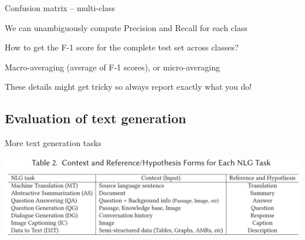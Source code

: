 \documentclass[12pt,aspectratio=169,handout]{beamer}
\begin{document}
\begin{frame}{Confusion matrix -- multi-class}

We can unambiguously compute Precision and Recall for each class

How to get the F-1 score for the complete test set across classes?

Macro-averaging (average of F-1 scores), or micro-averaging

These details might get tricky so always report exactly what you do!


\end{frame}















\subsection{Evaluation of text generation}


\begin{frame}{More text generation tasks}

\includegraphics[width=\linewidth]{img/nlg1.png}


\end{frame}
\end{document}
